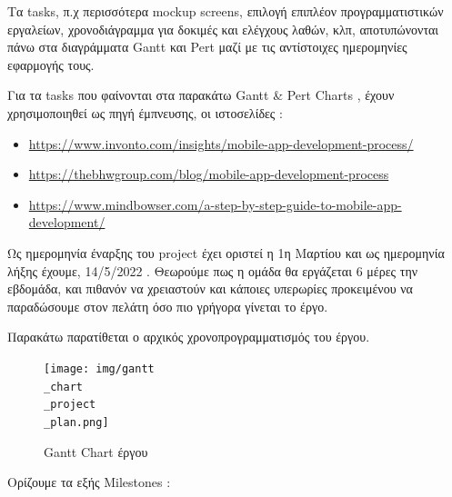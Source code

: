 \documentclass{../ol-softwaremanual}
\begin{document}
	\vspace{20pt}
	
	Τα \en tasks, \gr π.χ περισσότερα \en mockup screens\gr, επιλογή επιπλέον προγραμματιστικών εργαλείων,  χρονοδιάγραμμα για δοκιμές και ελέγχους λαθών, κλπ, αποτυπώνονται πάνω στα διαγράμματα \en Gantt \gr και \en Pert \gr μαζί με τις αντίστοιχες ημερομηνίες εφαρμογής τους. \break
	
	Για τα \en tasks \gr που φαίνονται στα παρακάτω \en Gantt \& Pert Charts \gr, έχουν χρησιμοποιηθεί ως πηγή έμπνευσης, οι ιστοσελίδες : 
	
	\begin{itemize}
		\item \en \url{https://www.invonto.com/insights/mobile-app-development-process/}
		\item \en \url{https://thebhwgroup.com/blog/mobile-app-development-process}
		\item \en \url{https://www.mindbowser.com/a-step-by-step-guide-to-mobile-app-development/}
	\end{itemize}
	\vspace{5pt}
	
	Ως ημερομηνία έναρξης του \en project \gr έχει οριστεί η 1η Μαρτίου και ως ημερομηνία λήξης έχουμε, 14/5/2022 . Θεωρούμε πως η ομάδα θα εργάζεται 6 μέρες την εβδομάδα, και πιθανόν να χρειαστούν και κάποιες υπερωρίες προκειμένου να παραδώσουμε στον πελάτη όσο πιο γρήγορα γίνεται το έργο. \\
	
	\newpage
	
	
	\vspace{10pt}	
	
	Παρακάτω παρατίθεται ο αρχικός χρονοπρογραμματισμός του έργου.
	
	\vspace{10pt}
	
	
	\flushleft
	
	\begin{figure}[htbp!]
		
		\texttt{[image: img/gantt\\\_chart\\\_project\\\_plan.png]}
		\caption{\en Gantt Chart \gr έργου}
		
		
	\end{figure}
	
	\vspace{20pt}
	Ορίζουμε τα εξής \en Milestones \gr :
	
\end{document}
